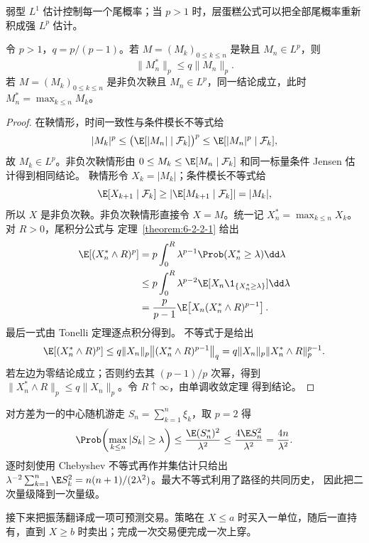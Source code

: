 弱型 $L^1$ 估计控制每一个尾概率；当 $p>1$ 时，层蛋糕公式可以把全部尾概率重新积成强
$L^p$ 估计。

\begin{theorem}\label{theorem:6-2-2-2}
令 $p>1$，$q=p/(p-1)$。若 $M=(M_k)_{0\le k\le n}$ 是鞅且
$M_n\in L^p$，则
\[
  \|M_n^*\|_p\le q\|M_n\|_p.
\]
若 $M=(M_k)_{0\le k\le n}$ 是非负次鞅且 $M_n\in L^p$，同一结论成立，此时
$M_n^*=\max_{k\le n}M_k$。
\end{theorem}

\begin{proof}
在鞅情形，时间一致性与条件模长不等式给
\[
 |M_k|^p
 \le\bigl(\E[|M_n|\mid\mathcal F_k]\bigr)^p
 \le\E[|M_n|^p\mid\mathcal F_k],
\]
故 $M_k\in L^p$。非负次鞅情形由
$0\le M_k\le\E[M_n\mid\mathcal F_k]$ 和同一标量条件 Jensen 估计得到相同结论。
鞅情形令 $X_k=|M_k|$；条件模长不等式给
\[
 \E[X_{k+1}\mid\mathcal F_k]
 \ge \left|\E[M_{k+1}\mid\mathcal F_k]\right|=|M_k|,
\]
所以 $X$ 是非负次鞅。非负次鞅情形直接令 $X=M$。统一记
$X_n^*=\max_{k\le n}X_k$。对 $R>0$，尾积分公式与
定理~\ref{theorem:6-2-2-1} 给出
\begin{align*}
 \E[(X_n^*\wedge R)^p]
 &=p\int_0^R\lambda^{p-1}\Prob(X_n^*\ge\lambda)\dd\lambda\\
 &\le p\int_0^R\lambda^{p-2}
       \E[X_n\1_{\{X_n^*\ge\lambda\}}]\dd\lambda\\
 &=\frac{p}{p-1}\E\!\left[X_n(X_n^*\wedge R)^{p-1}\right].
\end{align*}
最后一式由 Tonelli 定理逐点积分得到。\Holder{} 不等式于是给出
\[
 \E[(X_n^*\wedge R)^p]
 \le q\|X_n\|_p
       \bigl\|(X_n^*\wedge R)^{p-1}\bigr\|_q
 =q\|X_n\|_p
       \|X_n^*\wedge R\|_p^{p-1}.
\]
若左边为零结论成立；否则约去其 $(p-1)/p$ 次幂，得到
$\|X_n^*\wedge R\|_p\le q\|X_n\|_p$。令 $R\uparrow\infty$，由单调收敛定理
得到结论。
\end{proof}

\begin{example}[随机游走最大值]\label{ex:6-2-2-1}
对方差为一的中心随机游走 $S_n=\sum_{k=1}^n\xi_k$，取 $p=2$ 得
\[
 \Prob\!\left(\max_{k\le n}|S_k|\ge\lambda\right)
 \le \frac{\E(S_n^*)^2}{\lambda^2}
 \le \frac{4\E S_n^2}{\lambda^2}
 =\frac{4n}{\lambda^2}.
\]
逐时刻使用 Chebyshev 不等式再作并集估计只给出
$\lambda^{-2}\sum_{k=1}^n\E S_k^2=n(n+1)/(2\lambda^2)$。最大不等式利用了路径的共同历史，
因此把二次量级降到一次量级。
\end{example}

接下来把振荡翻译成一项可预测交易。策略在 $X\le a$ 时买入一单位，随后一直持有，直到
$X\ge b$ 时卖出；完成一次交易便完成一次上穿。

